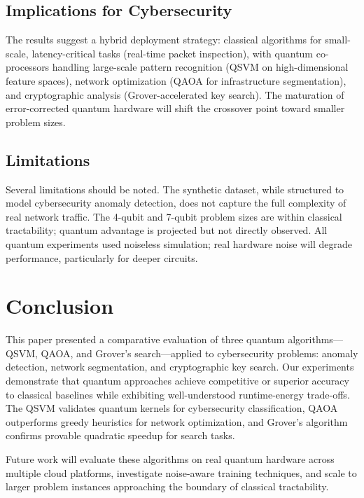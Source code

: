 \documentclass[conference]{IEEEtran}
\begin{document}
\subsection{Implications for Cybersecurity}

The results suggest a hybrid deployment strategy: classical algorithms for small-scale, latency-critical tasks (real-time packet inspection), with quantum co-processors handling large-scale pattern recognition (QSVM on high-dimensional feature spaces), network optimization (QAOA for infrastructure segmentation), and cryptographic analysis (Grover-accelerated key search). The maturation of error-corrected quantum hardware will shift the crossover point toward smaller problem sizes.

\subsection{Limitations}

Several limitations should be noted. The synthetic dataset, while structured to model cybersecurity anomaly detection, does not capture the full complexity of real network traffic. The 4-qubit and 7-qubit problem sizes are within classical tractability; quantum advantage is projected but not directly observed. All quantum experiments used noiseless simulation; real hardware noise will degrade performance, particularly for deeper circuits.

\section{Conclusion}

This paper presented a comparative evaluation of three quantum algorithms---QSVM, QAOA, and Grover's search---applied to cybersecurity problems: anomaly detection, network segmentation, and cryptographic key search. Our experiments demonstrate that quantum approaches achieve competitive or superior accuracy to classical baselines while exhibiting well-understood runtime-energy trade-offs. The QSVM validates quantum kernels for cybersecurity classification, QAOA outperforms greedy heuristics for network optimization, and Grover's algorithm confirms provable quadratic speedup for search tasks.

Future work will evaluate these algorithms on real quantum hardware across multiple cloud platforms, investigate noise-aware training techniques, and scale to larger problem instances approaching the boundary of classical tractability.
\end{document}
